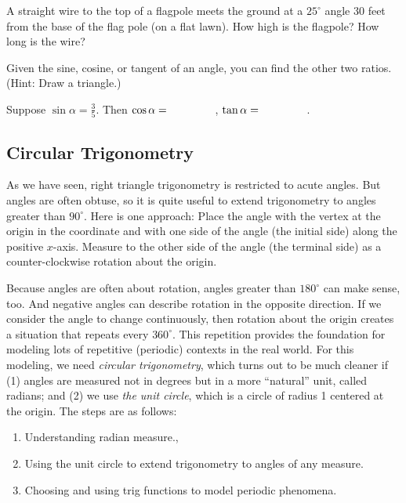 \begin{prob}
A straight wire to the top of a flagpole meets the ground at a $25^\circ$ angle 30 feet from the base of the flag pole (on a flat lawn).  How high is the flagpole?  How long is the wire?  
\end{prob}

Given the sine, cosine, or tangent of an angle, you can find the other two ratios.  (Hint: Draw a triangle.)

\begin{prob}
Suppose $\sin\alpha = \frac{3}{5}$.  Then $\cos\alpha = \hspace{0.6in}$, $\tan\alpha = \hspace{0.6in}$.  
\end{prob}

\subsection{Circular Trigonometry}
As we have seen, right triangle trigonometry is restricted to acute angles.  But angles are often obtuse, so it is quite useful to extend trigonometry to angles greater than $90^\circ$.  Here is one approach:  Place the angle with the vertex at the origin in the coordinate and with one side of the angle (the initial side) along the positive $x$-axis.  Measure to the other side of the angle (the terminal side) as a counter-clockwise rotation about the origin.   

%

Because angles are often about rotation, angles greater than $180^\circ$ can make sense, too.  And negative angles can describe rotation in the opposite direction.  If we consider the angle to change continuously, then rotation about the origin creates a situation that repeats every $360^\circ$.  This repetition provides the foundation for modeling lots of repetitive (periodic) contexts in the real world.  For this modeling, we need \emph{circular trigonometry}, which turns out to be much cleaner if (1) angles are measured not in degrees but in a more ``natural'' unit, called radians; and (2) we use \emph{the unit circle}, which is a circle of radius 1 centered at the origin.   The steps are as follows:  

\begin{enumerate}
\item Understanding radian measure., 

\item Using the unit circle to extend trigonometry to angles of any measure.

\item Choosing and using trig functions to model periodic phenomena.

\end{enumerate}


